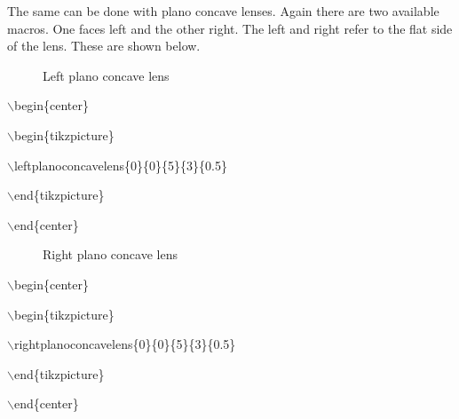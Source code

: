 \documentclass[12pt]{article}
\begin{document}
The same can be done with plano concave lenses. Again there are two available macros. One faces left and the other right. The left and right refer to the flat side of the lens. These are shown below.

\begin{minipage}{\textwidth}
\begin{minipage}{0.5\textwidth}

\begin{figure}[H]

\begin{center}


\end{center}

\caption{Left plano concave lens}
\end{figure}

$\backslash$begin\{center\}

$\backslash$begin\{tikzpicture\}

$\backslash$leftplanoconcavelens\{0\}\{0\}\{5\}\{3\}\{0.5\}

$\backslash$end\{tikzpicture\}

$\backslash$end\{center\}
\end{minipage}
\begin{minipage}{0.5\textwidth}

\begin{figure}[H]

\begin{center}


\end{center}

\caption{Right plano concave lens}
\end{figure}

$\backslash$begin\{center\}

$\backslash$begin\{tikzpicture\}

$\backslash$rightplanoconcavelens\{0\}\{0\}\{5\}\{3\}\{0.5\}

$\backslash$end\{tikzpicture\}

$\backslash$end\{center\}
\end{minipage}
\end{minipage}
\end{document}
